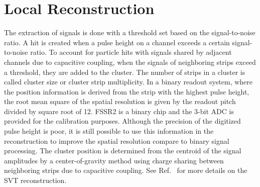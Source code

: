 \section{Local Reconstruction}

The extraction of signals is done with a threshold set based on the signal-to-noise ratio. A hit is created when a
pulse height on a channel exceeds a certain signal-to-noise ratio. To account for particle hits with signals shared
by adjacent channels due to capacitive coupling, when the signals of neighboring strips exceed a threshold, they
are added to the cluster. The number of strips in a cluster is called cluster size or cluster strip multiplicity. In a
binary readout system, where the position information is derived from the strip with the highest pulse height, the
root mean square of the spatial resolution is given by the readout pitch divided by square root of 12. FSSR2 is a
binary chip and the 3-bit ADC is provided for the calibration purposes. Although the precision of the digitized
pulse height is poor, it is still possible to use this information in the reconstruction to improve the spatial resolution
compare to binary signal processing. The cluster position is determined from the centroid of the signal amplitudes
by a center-of-gravity method using charge sharing between neighboring strips due to capacitive coupling. See
Ref.~\cite{recon-nim} for more details on the SVT reconstruction.
